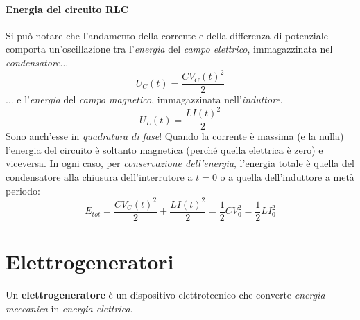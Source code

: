\paragraph{Energia del circuito RLC}
Si può notare che l'andamento della corrente e della differenza di potenziale comporta un'oscillazione tra l'\textit{energia} del \textit{campo elettrico}, immagazzinata nel \textit{condensatore}...
\begin{equation*}
	U_C(t)=\frac{CV_C(t)^2}{2}
\end{equation*}
... e l'\textit{energia} del \textit{campo magnetico}, immagazzinata nell'\textit{induttore}.
\begin{equation*}
	U_L(t)=\frac{LI(t)^2}{2}
\end{equation*}
Sono anch'esse in \textit{quadratura di fase}! Quando la corrente è massima (e la \ddp nulla) l'energia del circuito è soltanto magnetica (perché quella elettrica è zero) e viceversa. In ogni caso, per \textit{conservazione dell'energia}, l'energia totale è quella del condensatore alla chiusura dell'interrutore a $t=0$ o a quella dell'induttore a metà periodo:
\begin{equation}
	E_{tot}=\frac{CV_C(t)^2}{2}+\frac{LI(t)^2}{2}=\frac{1}{2}CV_0^2=\frac{1}{2}LI_0^2
\end{equation}
\section{Elettrogeneratori}
\begin{define}[Elettrogeneratore]
	Un \textbf{elettrogeneratore} è un dispositivo elettrotecnico che converte \textit{energia meccanica} in \textit{energia elettrica}.
\end{define}
